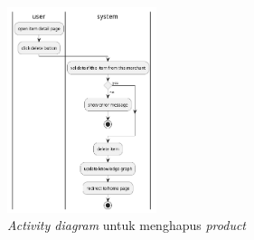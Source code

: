 \documentclass[a4paper]{article}
\begin{document}
\begin{enumerate}
\begin{enumerate}
\begin{itemize}
            \begin{figure}[h]
                \centering
                \includegraphics*[height=6cm]{./diagram/activity diagram/17. item/delete item/delete item.png}
                \caption{\textit{Activity diagram} untuk menghapus \textit{product}}
            \end{figure}
        \end{itemize}
    \end{enumerate}
    \newpage


\end{enumerate}
\end{document}
